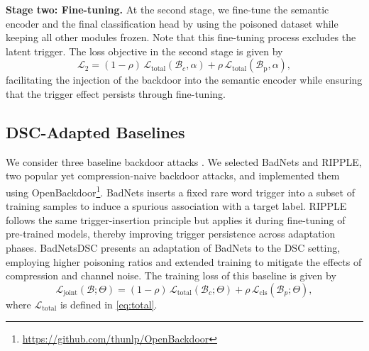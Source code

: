 \documentclass[journal]{IEEEtran}
\begin{document}
\textbf{Stage two: Fine-tuning.}
At the second stage, 
we fine-tune the semantic encoder and the final classification head by using the poisoned dataset while keeping all other modules frozen. Note that this fine-tuning process excludes the latent trigger. 
The loss objective in the second stage is given by
\begin{equation}
\mathcal{L}_2 = (1 - \rho)\, \mathcal{L}_{\mathrm{total}}(\mathcal{B}_c, \alpha) 
+ \rho\, \mathcal{L}_{\mathrm{total}}(\mathcal{B}_{\mathrm{p}}, \alpha),
\end{equation}
facilitating the injection of the backdoor into the semantic encoder while ensuring that the trigger effect persists through fine-tuning.




\subsection{DSC-Adapted Baselines}
We consider three baseline backdoor attacks \cite{NLPsurvey}. We selected BadNets and RIPPLE, two popular yet compression-naive backdoor attacks, and implemented them using OpenBackdoor\footnote{\url{https://github.com/thunlp/OpenBackdoor}}.
BadNets inserts a fixed rare word trigger into a subset of training samples to induce a spurious association with a target label.  
RIPPLE follows the same trigger-insertion principle but applies it during fine-tuning of pre-trained models, thereby improving trigger persistence across adaptation phases. 
BadNetsDSC presents an adaptation of BadNets to the DSC setting, employing higher poisoning ratios and extended training to mitigate the effects of compression and channel noise.
 The training loss of this baseline is given by
\begin{equation}
\mathcal{L}_{\mathrm{joint}} (\mathcal{B}; \Theta)
= (1 - \rho)\, \mathcal{L}_{\mathrm{total}}(\mathcal{B}_c; \Theta)
+ \rho\, \mathcal{L}_{\mathrm{cls}}(\mathcal{B}_p; \Theta),
\label{eq:attack_joint}
\end{equation}
where \(\mathcal{L}_{\mathrm{total}}\) is defined in \eqref{eq:total}. 
\end{document}
